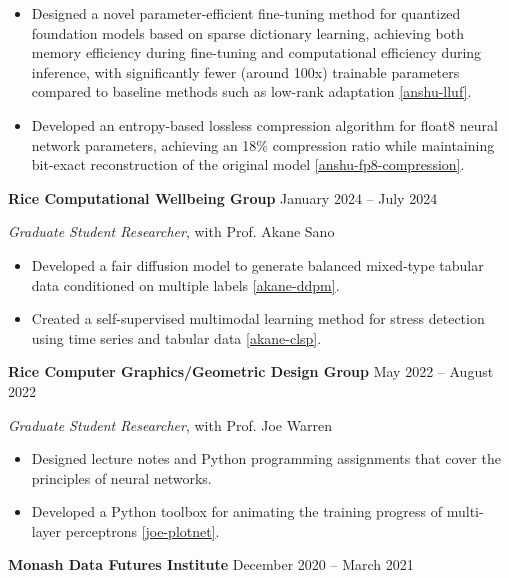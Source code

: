 \documentclass[11pt]{article}
\begin{document}
\begin{itemize}
    \item Designed a novel parameter-efficient fine-tuning method for quantized foundation models based on sparse dictionary learning, achieving both memory efficiency during fine-tuning and computational efficiency during inference, with significantly fewer (around 100x) trainable parameters compared to baseline methods such as low-rank adaptation \ref{anshu-lluf}.
    \item Developed an entropy-based lossless compression algorithm for float8 neural network parameters, achieving an 18\% compression ratio while maintaining bit-exact reconstruction of the original model \ref{anshu-fp8-compression}.
\end{itemize}

\vspace{\lineskip}

\textbf{Rice Computational Wellbeing Group} \hfill January 2024 -- July 2024

\textit{Graduate Student Researcher}, with Prof. Akane Sano

\begin{itemize}
    \item Developed a fair diffusion model to generate balanced mixed-type tabular data conditioned on multiple labels \ref{akane-ddpm}.
    \item Created a self-supervised multimodal learning method for stress detection using time series and tabular data \ref{akane-clsp}.
\end{itemize}

\vspace{\lineskip}

\textbf{Rice Computer Graphics/Geometric Design Group} \hfill May 2022 -- August 2022

\textit{Graduate Student Researcher}, with Prof. Joe Warren

\begin{itemize}
    \item Designed lecture notes and Python programming assignments that cover the principles of neural networks.
    \item Developed a Python toolbox for animating the training progress of multi-layer perceptrons \ref{joe-plotnet}.
\end{itemize}

\vspace{\lineskip}

\textbf{Monash Data Futures Institute} \hfill December 2020 -- March 2021
\end{document}
